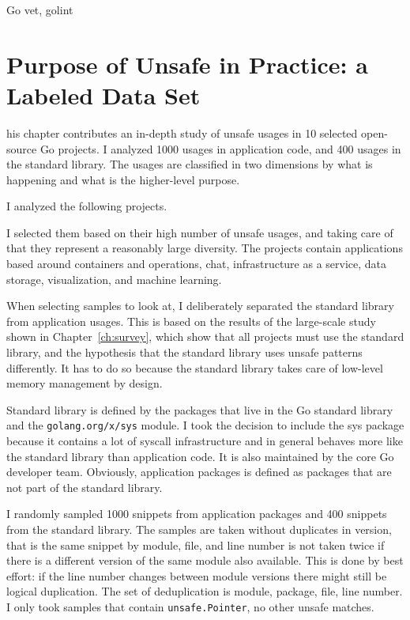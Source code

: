 Go vet, golint



\section{Purpose of Unsafe in Practice: a Labeled Data Set}\label{sec:go-geiger:labeled-dataset}

his chapter contributes an in-depth study of unsafe usages in 10 selected open-source Go projects.
I analyzed 1000 usages in application code, and 400 usages in the standard library.
The usages are classified in two dimensions by what is happening and what is the higher-level purpose.

I analyzed the following projects.



I selected them based on their high number of unsafe usages, and taking care of that they represent a reasonably large
diversity.
The projects contain applications based around containers and operations, chat, infrastructure as a service, data
storage, visualization, and machine learning.

When selecting samples to look at, I deliberately separated the standard library from application usages.
This is based on the results of the large-scale study shown in Chapter~\ref{ch:survey}, which show that all projects
must use the standard library, and the hypothesis that the standard library uses unsafe patterns differently.
It has to do so because the standard library takes care of low-level memory management by design.

Standard library is defined by the packages that live in the Go standard library and the \texttt{golang.org/x/sys}
module.
I took the decision to include the sys package because it contains a lot of syscall infrastructure and in general
behaves more like the standard library than application code.
It is also maintained by the core Go developer team.
Obviously, application packages is defined as packages that are not part of the standard library.

I randomly sampled 1000 snippets from application packages and 400 snippets from the standard library.
The samples are taken without duplicates in version, that is the same snippet by module, file, and line number is not
taken twice if there is a different version of the same module also available.
This is done by best effort: if the line number changes between module versions there might still be logical
duplication.
The set of deduplication is module, package, file, line number.
I only took samples that contain \texttt{unsafe.Pointer}, no other unsafe matches.

